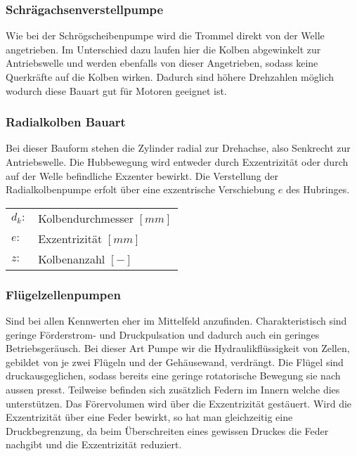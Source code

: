 \subsubsection{Schrägachsenverstellpumpe}
Wie bei der Schrögscheibenpumpe wird die Trommel direkt von der Welle angetrieben. Im Unterschied dazu laufen hier die Kolben abgewinkelt zur Antriebswelle und werden ebenfalls von dieser Angetrieben, sodass keine Querkräfte auf die Kolben wirken. Dadurch sind höhere Drehzahlen möglich wodurch diese Bauart gut für Motoren geeignet ist. 


\subsubsection{Radialkolben Bauart}
Bei dieser Bauform stehen die Zylinder radial zur Drehachse, also Senkrecht zur Antriebswelle. Die Hubbewegung wird entweder durch Exzentrizität oder durch auf der Welle befindliche Exzenter bewirkt. Die Verstellung der Radialkolbenpumpe erfolt über eine exzentrische Verschiebung $e$ des Hubringes. 

\begin{tabular}{ll}
$d_k:$ & Kolbendurchmesser $[mm]$ \\
$e:$ & Exzentrizität $[mm]$ \\
$z:$ & Kolbenanzahl $[-]$ 
\end{tabular}



\subsubsection{Flügelzellenpumpen}
Sind bei allen Kennwerten eher im Mittelfeld anzufinden.
Charakteristisch sind geringe Förderstrom- und Druckpulsation und dadurch auch ein geringes Betriebsgeräusch. Bei dieser Art Pumpe wir die Hydraulikflüssigkeit von Zellen, gebildet von je zwei Flügeln und der Gehäusewand, verdrängt. Die Flügel sind druckausgeglichen, sodass bereits eine geringe rotatorische Bewegung sie nach aussen presst. Teilweise befinden sich zusätzlich Federn im Innern welche dies unterstützen. Das Förervolumen wird über die Exzentrizität gestäuert. Wird die Exzentrizität über eine Feder bewirkt, so hat man gleichzeitig eine Druckbegrenzung, da beim Überschreiten eines gewissen Druckes die Feder nachgibt und die Exzentrizität reduziert. 


